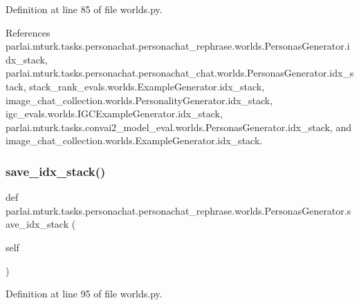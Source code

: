 Definition at line 85 of file worlds.\+py.



References parlai.\+mturk.\+tasks.\+personachat.\+personachat\+\_\+rephrase.\+worlds.\+Personas\+Generator.\+idx\+\_\+stack, parlai.\+mturk.\+tasks.\+personachat.\+personachat\+\_\+chat.\+worlds.\+Personas\+Generator.\+idx\+\_\+stack, stack\+\_\+rank\+\_\+evals.\+worlds.\+Example\+Generator.\+idx\+\_\+stack, image\+\_\+chat\+\_\+collection.\+worlds.\+Personality\+Generator.\+idx\+\_\+stack, igc\+\_\+evals.\+worlds.\+I\+G\+C\+Example\+Generator.\+idx\+\_\+stack, parlai.\+mturk.\+tasks.\+convai2\+\_\+model\+\_\+eval.\+worlds.\+Personas\+Generator.\+idx\+\_\+stack, and image\+\_\+chat\+\_\+collection.\+worlds.\+Example\+Generator.\+idx\+\_\+stack.

\mbox{\label{classparlai_1_1mturk_1_1tasks_1_1personachat_1_1personachat__rephrase_1_1worlds_1_1PersonasGenerator_afb148eb1f60598db4637faabd8a077f1}} 
\subsubsection{\texorpdfstring{save\+\_\+idx\+\_\+stack()}{save\_idx\_stack()}}
{\footnotesize\ttfamily def parlai.\+mturk.\+tasks.\+personachat.\+personachat\+\_\+rephrase.\+worlds.\+Personas\+Generator.\+save\+\_\+idx\+\_\+stack (\begin{DoxyParamCaption}\item[{}]{self }\end{DoxyParamCaption})}



Definition at line 95 of file worlds.\+py.



